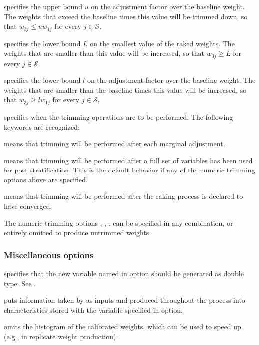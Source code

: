 \hangpara
{} specifies the upper bound $u$ on the adjustment
    factor over the baseline weight. The weights
    that exceed the baseline times this value will be trimmed down,
    so that $w_{3j} \le u w_{1j}$ for every $j\in\mathcal{S}$.

\hangpara
{} specifies the lower bound $L$ on the smallest value
    of the raked weights.  The weights that are smaller than this value will
    be increased, so that $w_{3j} \ge L$ for every $j\in\mathcal{S}$.

\hangpara
{} specifies the lower bound $l$ on the adjustment factor
    over the baseline weight.  The weights that are smaller than the baseline
    times this value will be increased, so that
    $w_{3j} \ge l w_{1j}$ for every $j\in\mathcal{S}$.

\hangpara
{} specifies when the trimming operations
    are to be performed. The following keywords are recognized:

\morehang {} means that trimming will be performed
    after each marginal adjustment.

\morehang {} means that trimming will be performed
    after a full set of variables has been used for post-stratification.
    This is the default behavior if any of the numeric trimming
    options above are specified.

\morehang {}
    means that trimming will be performed after the raking process
    is declared to have converged.

The numeric trimming options , ,
,  can be specified in any combination,
or entirely omitted to produce untrimmed weights.

\subsubsection{Miscellaneous options}

\hangpara
{} specifies that the new variable named in 
option should be generated as double type. See .

\hangpara
{} puts information taken by  as inputs and produced
    throughout the process into characteristics stored with the variable specified in
     option.

\hangpara
{} omits the histogram of the calibrated weights, which can be
used to speed up  (e.g., in replicate weight production).

